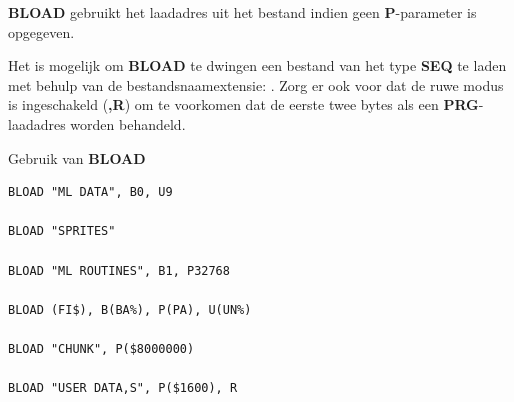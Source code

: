 \begin{description}[leftmargin=2cm,style=nextline]
                  {\bf BLOAD} gebruikt het laadadres uit het bestand indien geen {\bf P}-parameter is opgegeven.

                  Het is mogelijk om {\bf BLOAD} te dwingen een bestand van het type {\bf SEQ} te laden met behulp van de bestandsnaamextensie: . Zorg er ook voor dat de ruwe modus is ingeschakeld ({\bf ,R}) om te voorkomen dat de eerste twee bytes als een {\bf PRG}-laadadres worden behandeld.

\item [Voorbeelden:] Gebruik van {\bf BLOAD}

\begin{tcolorbox}[colback=black,coltext=white]
\verbatimfont{\codefont}
\begin{verbatim}
BLOAD "ML DATA", B0, U9

BLOAD "SPRITES"

BLOAD "ML ROUTINES", B1, P32768

BLOAD (FI$), B(BA%), P(PA), U(UN%)

BLOAD "CHUNK", P($8000000)

BLOAD "USER DATA,S", P($1600), R
\end{verbatim}
\end{tcolorbox}
\end{description}


\newpage

